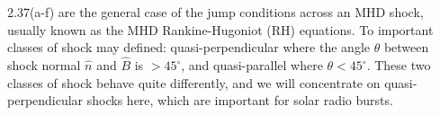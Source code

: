 2.37(a-f) are the general case of the jump conditions across an MHD shock, usually known as the MHD Rankine-Hugoniot (RH) equations. To important classes of shock may defined: quasi-perpendicular where the angle $\theta$ between shock normal $\hat{n}$ and $\hat{B}$ is $>45^{\circ}$, and quasi-parallel where $\theta<45^{\circ}$. These two classes of shock behave quite differently, and we will concentrate on quasi-perpendicular shocks here, which are important for solar radio bursts.

